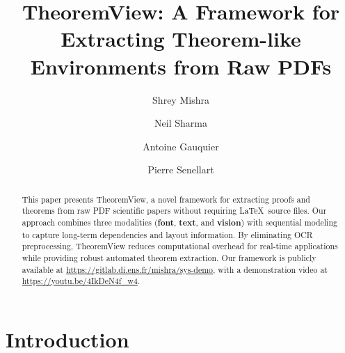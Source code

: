 \documentclass[runningheads]{llncs}
\begin{document}
%
\title{TheoremView: A Framework for Extracting Theorem-like Environments from Raw PDFs}
%
%
\author{Shrey Mishra \and
Neil Sharma \and
Antoine Gauquier \and
Pierre Senellart}



\maketitle              %
%
\begin{abstract}
This paper presents TheoremView, a novel framework for extracting proofs and theorems from raw PDF scientific papers without requiring \LaTeX~source files. Our approach combines three modalities (\textbf{font}, \textbf{text}, and \textbf{vision}) with sequential modeling to capture long-term dependencies and layout information. By eliminating OCR preprocessing, TheoremView reduces computational overhead for real-time applications while providing robust automated theorem extraction. Our framework is publicly available at \url{https://gitlab.di.ens.fr/mishra/sys-demo}, with a demonstration video at \url{https://youtu.be/4IkDeN4f_w4}.


\end{abstract}


\section{Introduction}
\end{document}

